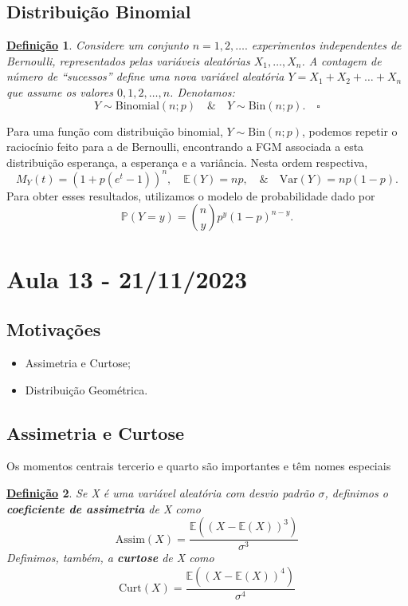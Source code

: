 \documentclass{article}
\newtheorem*{def*}{\underline{Defini\c c\~ao}}
\begin{document}
\subsection{Distribuição Binomial}
\begin{def*}
  Considere um conjunto \(n=1, 2, \dotsc.\) experimentos independentes de Bernoulli, representados pelas variáveis aleatórias \(X_{1}, \dotsc, X_{n}\). A contagem de número de ``sucessos''
  define uma nova variável aleatória \(Y = X_{1} + X_{2} + \dotsc + X_{n}\) que assume os valores \(0, 1, 2, \dotsc, n\). Denotamos:
  \[
    Y \sim \mathrm{Binomial}(n; p)\quad\&\quad Y \sim \mathrm{Bin}(n; p).\quad\square
  \]
\end{def*}
Para uma função com distribuição binomial, \(Y\sim \mathrm{Bin}(n; p)\), podemos repetir o raciocínio feito para a de Bernoulli, encontrando a FGM associada a esta distribuição esperança, a esperança e a variância.
Nesta ordem respectiva, 
\[
  M_{Y}(t) = (1+p(e^{t}-1))^{n},\quad \mathbb{E}(Y) = np,\quad\&\quad \mathrm{Var}(Y) = np(1-p).
\]
Para obter esses resultados, utilizamos o modelo de probabilidade dado por 
\[
  \mathbb{P}(Y=y) = \binom{n}{y}p^{y}(1-p)^{n-y}.
\]
\newpage

\section{Aula 13 - 21/11/2023}
\subsection{Motivações}
\begin{itemize}
  \item Assimetria e Curtose;
  \item Distribuição Geométrica.
\end{itemize}
\subsection{Assimetria e Curtose}
Os momentos centrais tercerio e quarto são importantes e têm nomes especiais
\begin{def*}
  Se X é uma variável aleatória com desvio padrão \(\sigma \), definimos o \textbf{coeficiente de assimetria} de X como 
  \[
    \mathrm{Assim}(X) = \frac{\mathbb{E}((X-\mathbb{E}(X))^{3})}{\sigma^{3}}
  \]
  Definimos, também, a \textbf{curtose}\footnotemark[1] de X como 
  \[
    \mathrm{Curt}(X) = \frac{\mathbb{E}((X-\mathbb{E}(X))^{4})}{\sigma^{4}}
  \]
\end{def*}
\end{document}
